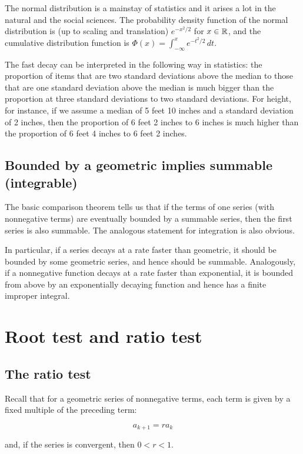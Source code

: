 \documentclass[10pt]{amsart}
\begin{document}
The normal distribution is a mainstay of statistics and it arises a
lot in the natural and the social sciences. The probability density
function of the normal distribution is (up to scaling and translation)
$e^{-x^2/2}$ for $x \in \mathbb{R}$, and the cumulative distribution function
is $\Phi(x) = \int_{-\infty}^x e^{-t^2/2} \, dt$.

The fast decay can be interpreted in the following way in statistics:
the proportion of items that are two standard deviations above the
median to those that are one standard deviation above the median is
much bigger than the proportion at three standard deviations to two
standard deviations. For height, for instance, if we assume a median
of 5 feet 10 inches and a standard deviation of 2 inches, then the
proportion of 6 feet 2 inches to 6 inches is much higher than the
proportion of 6 feet 4 inches to 6 feet 2 inches.

\subsection{Bounded by a geometric implies summable (integrable)}

The basic comparison theorem tells us that if the terms of one series
(with nonnegative terms) are eventually bounded by a summable series,
then the first series is also summable. The analogous statement for
integration is also obvious.

In particular, if a series decays at a rate faster than geometric, it
should be bounded by some geometric series, and hence should be
summable. Analogously, if a nonnegative function decays at a rate
faster than exponential, it is bounded from above by an exponentially
decaying function and hence has a finite improper integral.

\section{Root test and ratio test}

\subsection{The ratio test}

Recall that for a geometric series of nonnegative terms, each term is
given by a fixed multiple of the preceding term:

$$a_{k+1} = ra_k$$

and, if the series is convergent, then $0 < r < 1$.
\end{document}
